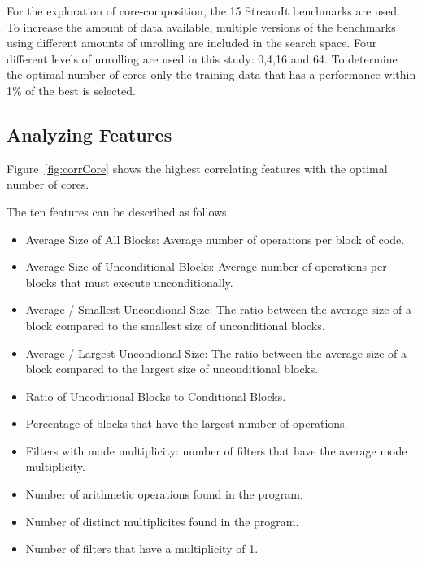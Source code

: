 For the exploration of core-composition, the 15 StreamIt benchmarks are used. %
To increase the amount of data available, multiple versions of the benchmarks using different amounts of unrolling are included in the search space.
Four different levels of unrolling are used in this study: 0,4,16 and 64.
To determine the optimal number of cores only the training data that has a performance within 1\% of the best is selected.

\subsection{Analyzing Features}

Figure~\ref{fig:corrCore} shows the highest correlating features with the optimal number of cores.

The ten features can be described as follows
\begin{itemize}
\item Average Size of All Blocks: Average number of operations per block of code.
\vspace{-1em}
\item Average Size of Unconditional Blocks: Average number of operations per blocks that must execute unconditionally.
\vspace{-1em}
\item Average / Smallest Uncondional Size: The ratio between the average size of a block compared to the smallest size of unconditional blocks.
\vspace{-1em}
\item Average / Largest Uncondional Size: The ratio between the average size of a block compared to the largest size of unconditional blocks.
\vspace{-1em}
\item Ratio of Uncoditional Blocks to Conditional Blocks.
\vspace{-1em}
\item Percentage of blocks that have the largest number of operations.
\vspace{-1em}
\item Filters with mode multiplicity: number of filters that have the average mode multiplicity.
\vspace{-1em}
\item Number of arithmetic operations found in the program.
\vspace{-1em}
\item Number of distinct multiplicites found in the program.
\vspace{-1em}
\item Number of filters that have a multiplicity of 1.
\end{itemize}

